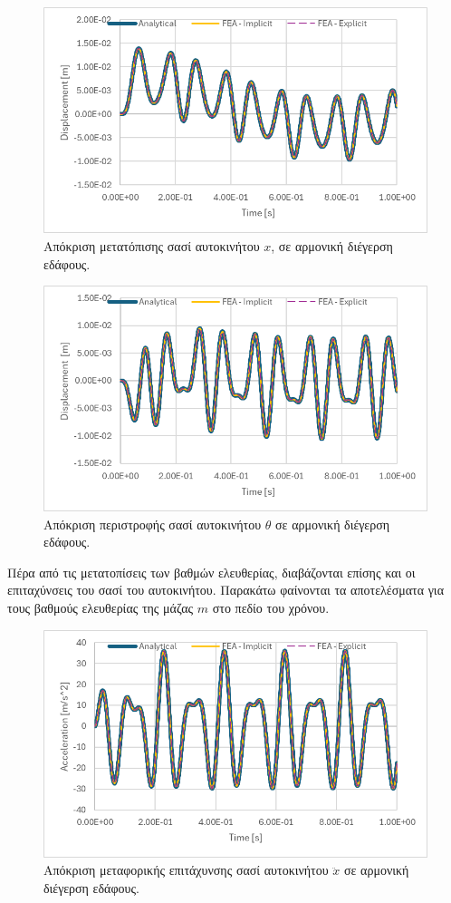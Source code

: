 \documentclass{article}
\begin{document}
\begin{figure}[H]
    \centering
    \includegraphics[width=0.8\linewidth]{media/d-x.png}
    \caption{Απόκριση μετατόπισης σασί αυτοκινήτου $x$, σε αρμονική διέγερση εδάφους.}
    \label{fig:d-x}
\end{figure}

\begin{figure}[H]
    \centering
    \includegraphics[width=0.8\linewidth]{media/d-th.png}
    \caption{Απόκριση περιστροφής σασί αυτοκινήτου $\theta$ σε αρμονική διέγερση εδάφους.}
    \label{fig:d-th}
\end{figure}

Πέρα από τις μετατοπίσεις των βαθμών ελευθερίας, διαβάζονται επίσης και οι επιταχύνσεις του σασί του αυτοκινήτου. Παρακάτω φαίνονται τα αποτελέσματα για τους βαθμούς ελευθερίας της μάζας $m$ στο πεδίο του χρόνου.

\begin{figure}[H]
    \centering
    \includegraphics[width=0.8\linewidth]{media/a-x.png}
    \caption{Απόκριση μεταφορικής επιτάχυνσης σασί αυτοκινήτου $\ddot{x}$ σε αρμονική διέγερση εδάφους.}
    \label{fig:a-x}
\end{figure}
\end{document}
